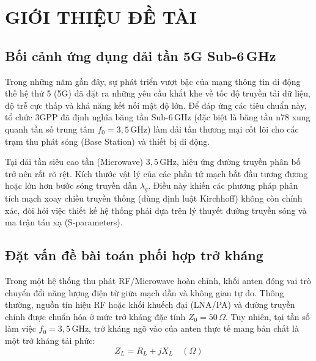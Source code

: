 \documentclass[a4paper]{report}
\newcommand\Zo{Z_0}
\newcommand\ZL{Z_L}
\newcommand\GHz{\,\mathrm{GHz}}
\begin{document}
\cleardoublepage
\listoftables
\cleardoublepage
\listoffigures

\phanchinh


\section{GIỚI THIỆU ĐỀ TÀI}

\subsection{Bối cảnh ứng dụng dải tần 5G Sub-6\,GHz}
Trong những năm gần đây, sự phát triển vượt bậc của mạng thông tin di động thế hệ thứ 5 (5G) đã đặt ra những yêu cầu khắt khe về tốc độ truyền tải dữ liệu, độ trễ cực thấp và khả năng kết nối mật độ lớn. Để đáp ứng các tiêu chuẩn này, tổ chức 3GPP đã định nghĩa băng tần Sub-6\,GHz (đặc biệt là băng tần n78 xung quanh tần số trung tâm $f_0=3{,}5\GHz$) làm dải tần thương mại cốt lõi cho các trạm thu phát sóng (Base Station) và thiết bị di động.

Tại dải tần siêu cao tần (Microwave) $3{,}5\GHz$, hiệu ứng đường truyền phân bố trở nên rất rõ rệt. Kích thước vật lý của các phần tử mạch bắt đầu tương đương hoặc lớn hơn bước sóng truyền dẫn $\lambda_g$. Điều này khiến các phương pháp phân tích mạch xoay chiều truyền thống (dùng định luật Kirchhoff) không còn chính xác, đòi hỏi việc thiết kế hệ thống phải dựa trên lý thuyết đường truyền sóng và ma trận tán xạ (S-parameters).

\subsection{Đặt vấn đề bài toán phối hợp trở kháng}
Trong một hệ thống thu phát RF/Microwave hoàn chỉnh, khối anten đóng vai trò chuyển đổi năng lượng điện từ giữa mạch dẫn và không gian tự do. Thông thường, nguồn tín hiệu RF hoặc khối khuếch đại (LNA/PA) và đường truyền chính được chuẩn hóa ở mức trở kháng đặc tính $\Zo=50\,\Omega$. Tuy nhiên, tại tần số làm việc $f_0=3{,}5\GHz$, trở kháng ngõ vào của anten thực tế mang bản chất là một trở kháng tải phức:
\begin{equation}
  \ZL = R_L + jX_L \quad (\Omega)
\end{equation}
\end{document}
